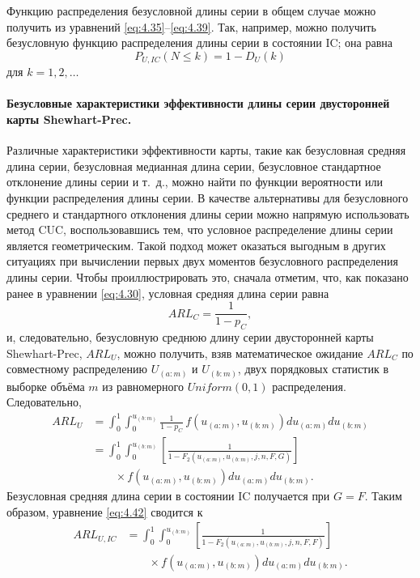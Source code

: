 Функцию распределения безусловной длины серии в общем случае можно получить из уравнений \eqref{eq:4.35}--\eqref{eq:4.39}. Так, например, можно получить безусловную функцию распределения длины серии в состоянии IC; она равна
\begin{equation}
	P_{U, IC}(N \le k) = 1 - D_U(k)
	\label{eq:4.40}
\end{equation}
для \(k = 1, 2, \ldots\)

\paragraph{Безусловные характеристики эффективности длины серии двусторонней карты Shewhart-Prec.} Различные характеристики эффективности карты, такие как безусловная средняя длина серии, безусловная медианная длина серии, безусловное стандартное отклонение длины серии и т.~д., можно найти по функции вероятности или функции распределения длины серии. В качестве альтернативы для безусловного среднего и стандартного отклонения длины серии можно напрямую использовать метод CUC, воспользовавшись тем, что условное распределение длины серии является геометрическим. Такой подход может оказаться выгодным в других ситуациях при вычислении первых двух моментов безусловного распределения длины серии. Чтобы проиллюстрировать это, сначала отметим, что, как показано ранее в уравнении \eqref{eq:4.30}, условная средняя длина серии равна
\begin{equation}
	ARL_C = \frac{1}{1 - p_C},
	\label{eq:4.41}
\end{equation}
и, следовательно, безусловную среднюю длину серии двусторонней карты Shewhart-Prec, \(ARL_U\), можно получить, взяв математическое ожидание \(ARL_C\) по совместному распределению \(U_{(a:m)}\) и \(U_{(b:m)}\), двух порядковых статистик в выборке объёма \(m\) из равномерного \(Uniform(0, 1)\) распределения. Следовательно,
\begin{equation}
\begin{aligned}
	ARL_U &= \int_{0}^{1}\int_{0}^{u_{(b:m)}} \frac{1}{1 - p_C}\, f\left(u_{(a:m)}, u_{(b:m)}\right) du_{(a:m)} du_{(b:m)} \\
	      &= \int_{0}^{1}\int_{0}^{u_{(b:m)}} \left[ \frac{1}{1 - F_2\left( u_{(a:m)}, u_{(b:m)}, j, n, F, G \right)} \right] \\
	      &\qquad \times f\left(u_{(a:m)}, u_{(b:m)}\right) du_{(a:m)} du_{(b:m)}.
\end{aligned}
\label{eq:4.42}
\end{equation}
Безусловная средняя длина серии в состоянии IC получается при \(G = F\). Таким образом, уравнение \eqref{eq:4.42} сводится к
\begin{equation}
\begin{aligned}
	ARL_{U, IC} &= \int_{0}^{1}\int_{0}^{u_{(b:m)}} \left[ \frac{1}{1 - F_2\left( u_{(a:m)}, u_{(b:m)}, j, n, F, F \right)} \right] \\
	            &\qquad \times f\left(u_{(a:m)}, u_{(b:m)}\right) du_{(a:m)} du_{(b:m)}.
\end{aligned}
\label{eq:4.43}
\end{equation}

